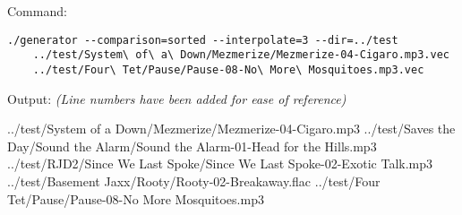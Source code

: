 Command:
\begin{verbatim}
./generator --comparison=sorted --interpolate=3 --dir=../test
    ../test/System\ of\ a\ Down/Mezmerize/Mezmerize-04-Cigaro.mp3.vec
    ../test/Four\ Tet/Pause/Pause-08-No\ More\ Mosquitoes.mp3.vec
\end{verbatim}
Output: \small \emph{(Line numbers have been added for ease of reference)}
\begin{listing}{1}
../test/System of a Down/Mezmerize/Mezmerize-04-Cigaro.mp3
../test/Saves the Day/Sound the Alarm/Sound the Alarm-01-Head for the Hills.mp3
../test/RJD2/Since We Last Spoke/Since We Last Spoke-02-Exotic Talk.mp3
../test/Basement Jaxx/Rooty/Rooty-02-Breakaway.flac
../test/Four Tet/Pause/Pause-08-No More Mosquitoes.mp3
\end{listing}

